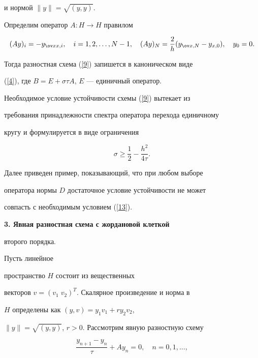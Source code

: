 и нормой $\|y\|=\sqrt{(y,y)}$.


Определим оператор $A:H\to H$ правилом


\begin{equation}\label{11}


(Ay)_{i}=-y_{\ov x x,i},\quad i=1,2,\dotsc, N-1,\quad


(Ay)_{N}=\frac{2}{h}(y_{\ov x,N}-y_{x,0}), \quad y_{0}=0.


\end{equation}


Тогда разностная схема (\ref{9}) запишется в каноническом виде


(\ref{4}), где $B=E+\sigma \tau A$, $E$ --- единичный оператор.





Необходимое условие устойчивости схемы (\ref{9}) вытекает из


требования принадлежности спектра оператора перехода единичному


кругу и формулируется в виде ограничения


\begin{equation}\label{13}


\sigma \geqslant \frac{1} {2}-\frac{{h^2}} {{4\tau}}.


\end{equation}





Далее приведен пример, показывающий, что при любом выборе


оператора нормы $D$ достаточное условие устойчивости не может


совпасть с необходимым условием (\ref{13}).


\medskip





{\bf 3. Явная разностная схема с жордановой клеткой


второго порядка.} Пусть линейное


пространство $H$ состоит из вещественных


векторов $v=(v_{1}\;v_{2})^T$. Скалярное произведение и норма в


$H$ определены как $(y,v)=y_1 v_1+r y_2 v_2$,


$\|y\|=\sqrt{(y,y)}$, $r>0$. Рассмотрим явную разностную схему


\begin{equation}\label{14}


\frac{{y_{n+1}-y_n}} {\tau}+Ay_n=0,\quad n=0,1,\dotsc,


\end{equation}


